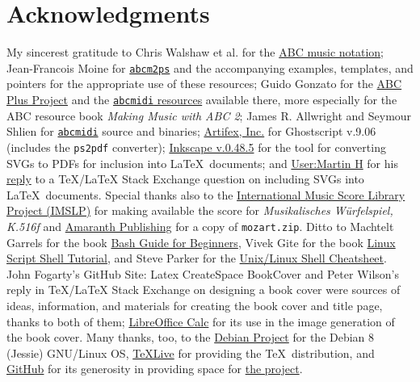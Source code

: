 \documentclass[letterpaper,x11names,svgnames,10pt]{article}
\begin{document}
{\section{Acknowledgments}
My sincerest gratitude to Chris Walshaw et al. for the \hyperlink{http://www.abcnotation.com/}{ABC music notation}; Jean-Francois Moine for \hyperlink{http://moinejf.free.fr/}{\tt abcm2ps} and the accompanying examples, templates, and pointers for the appropriate use of these resources; Guido Gonzato for the \hyperlink{http://abcplus.sourceforge.net/}{ABC Plus Project} and the \hyperlink{http://abcplus.sourceforge.net/#abcMIDI}{{\tt abcmidi} resources} available there, more especially for the ABC resource book {\em Making Music with ABC 2}; James R. Allwright and Seymour Shlien for \hyperlink{http://abc.sourceforge.net/abcMIDI}{\tt abcmidi} source and binaries; \hyperlink{https://artifex.com/}{Artifex, Inc.} for Ghostscript v.9.06 (includes the {\tt ps2pdf} converter); \hyperlink{https://www.inkscape.org/}{Inkscape v.0.48.5} for the tool for converting SVGs to PDFs for inclusion into \LaTeX\ documents; and \hyperlink{https://tex.stackexchange.com/users/632/martin-h}{User:Martin H} for his \hyperlink{https://tex.stackexchange.com/questions/2099/how-to-include-svg-diagrams-in-latex}{reply} to a TeX/LaTeX Stack Exchange question on including SVGs into \LaTeX\ documents. Special thanks also to the \hyperlink{http://imslp.org/}{International Music Score Library Project (IMSLP)} for making available the score for {\em Musikalisches W\"{u}rfelspiel, K.516f} and \hyperlink{http://www.amaranthpublishing.com/MozartDiceGame.htm}{Amaranth Publishing} for a copy of {\tt mozart.zip}. Ditto to Machtelt Garrels for the book \hyperlink{http://tldp.org/LDP/Bash-Beginners-Guide/html/Bash-Beginners-Guide.html}{Bash Guide for Beginners}, Vivek Gite for the book \hyperlink{http://www.freeos.com/guides/lsst/}{Linux Script Shell Tutorial}, and Steve Parker for the \hyperlink{http://steve-parker.org/sh/cheatsheet.pdf}{Unix/Linux Shell Cheatsheet}. John Fogarty's GitHub Site: Latex CreateSpace BookCover and Peter Wilson's reply in TeX/LaTeX Stack Exchange on designing a book cover were sources of ideas, information, and materials for creating the book cover and title page, thanks to both of them; \hyperlink{http://www.libreoffice.org/}{LibreOffice Calc} for its use in the image generation of the book cover.  Many thanks, too, to the \hyperlink{https://www.debian.org}{Debian Project} for the Debian 8 (Jessie) GNU/Linux OS, \hyperlink{http://www.tug.org/texlive/}{TeXLive} for providing the \TeX\ distribution,  and \hyperlink{https://github.org}{GitHub} for its generosity in providing space for \hyperlink{https://github.com/justineuro/mdgBookSVGv1}{the project}.  

}
\end{document}
